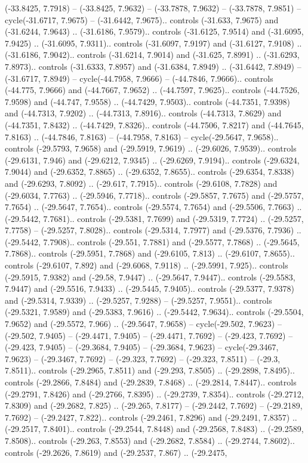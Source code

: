 \begin{scope}[shift={(2.5552, 9.9912)}]
\begin{scope}[shift={(48.1654, -14.8546)}]
(-33.8425, 7.7918) -- (-33.8425, 7.9632) -- (-33.7878, 7.9632) -- (-33.7878, 7.9851) -- cycle(-31.6717, 7.9675) -- (-31.6442, 7.9675).. controls (-31.633, 7.9675) and (-31.6244, 7.9643) .. (-31.6186, 7.9579).. controls (-31.6125, 7.9514) and (-31.6095, 7.9425) .. (-31.6095, 7.9311).. controls (-31.6097, 7.9197) and (-31.6127, 7.9108) .. (-31.6186, 7.9042).. controls (-31.6214, 7.9014) and (-31.625, 7.8991) .. (-31.6293, 7.8973).. controls (-31.6333, 7.8957) and (-31.6384, 7.8949) .. (-31.6442, 7.8949) -- (-31.6717, 7.8949) -- cycle(-44.7958, 7.9666) -- (-44.7846, 7.9666).. controls (-44.775, 7.9666) and (-44.7667, 7.9652) .. (-44.7597, 7.9625).. controls (-44.7526, 7.9598) and (-44.747, 7.9558) .. (-44.7429, 7.9503).. controls (-44.7351, 7.9398) and (-44.7313, 7.9202) .. (-44.7313, 7.8916).. controls (-44.7313, 7.8629) and (-44.7351, 7.8432) .. (-44.7429, 7.8326).. controls (-44.7506, 7.8217) and (-44.7645, 7.8163) .. (-44.7846, 7.8163) -- (-44.7958, 7.8163) -- cycle(-29.5647, 7.9658).. controls (-29.5793, 7.9658) and (-29.5919, 7.9619) .. (-29.6026, 7.9539).. controls (-29.6131, 7.946) and (-29.6212, 7.9345) .. (-29.6269, 7.9194).. controls (-29.6324, 7.9044) and (-29.6352, 7.8865) .. (-29.6352, 7.8655).. controls (-29.6354, 7.8338) and (-29.6293, 7.8092) .. (-29.617, 7.7915).. controls (-29.6108, 7.7828) and (-29.6034, 7.7763) .. (-29.5946, 7.7718).. controls (-29.5857, 7.7675) and (-29.5757, 7.7654) .. (-29.5647, 7.7654).. controls (-29.5574, 7.7654) and (-29.5506, 7.7663) .. (-29.5442, 7.7681).. controls (-29.5381, 7.7699) and (-29.5319, 7.7724) .. (-29.5257, 7.7758) -- (-29.5257, 7.8028).. controls (-29.5314, 7.7977) and (-29.5376, 7.7936) .. (-29.5442, 7.7908).. controls (-29.551, 7.7881) and (-29.5577, 7.7868) .. (-29.5645, 7.7868).. controls (-29.5951, 7.7868) and (-29.6105, 7.813) .. (-29.6107, 7.8655).. controls (-29.6107, 7.892) and (-29.6068, 7.9118) .. (-29.5991, 7.925).. controls (-29.5915, 7.9382) and (-29.58, 7.9447) .. (-29.5647, 7.9447).. controls (-29.5583, 7.9447) and (-29.5516, 7.9433) .. (-29.5445, 7.9405).. controls (-29.5377, 7.9378) and (-29.5314, 7.9339) .. (-29.5257, 7.9288) -- (-29.5257, 7.9551).. controls (-29.5321, 7.9589) and (-29.5383, 7.9616) .. (-29.5442, 7.9634).. controls (-29.5504, 7.9652) and (-29.5572, 7.966) .. (-29.5647, 7.9658) -- cycle(-29.502, 7.9623) -- (-29.502, 7.9405) -- (-29.4471, 7.9405) -- (-29.4471, 7.7692) -- (-29.423, 7.7692) -- (-29.423, 7.9405) -- (-29.3684, 7.9405) -- (-29.3684, 7.9623) -- cycle(-29.3467, 7.9623) -- (-29.3467, 7.7692) -- (-29.323, 7.7692) -- (-29.323, 7.8511) -- (-29.3, 7.8511).. controls (-29.2965, 7.8511) and (-29.293, 7.8505) .. (-29.2898, 7.8495).. controls (-29.2866, 7.8484) and (-29.2839, 7.8468) .. (-29.2814, 7.8447).. controls (-29.2791, 7.8426) and (-29.2766, 7.8395) .. (-29.2739, 7.8354).. controls (-29.2712, 7.8309) and (-29.2682, 7.825) .. (-29.265, 7.8177) -- (-29.2442, 7.7692) -- (-29.2189, 7.7692) -- (-29.2427, 7.822).. controls (-29.2461, 7.8296) and (-29.2491, 7.8357) .. (-29.2517, 7.8401).. controls (-29.2544, 7.8448) and (-29.2568, 7.8483) .. (-29.2589, 7.8508).. controls (-29.263, 7.8553) and (-29.2682, 7.8584) .. (-29.2744, 7.8602).. controls (-29.2626, 7.8619) and (-29.2537, 7.867) .. (-29.2475, 
\end{scope}
\end{scope}
